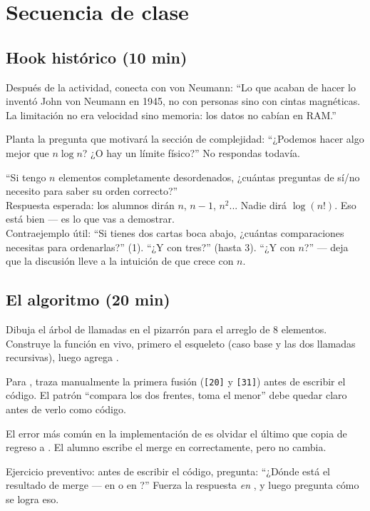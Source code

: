\documentclass[12pt, oneside]{article}
\begin{document}
\section{Secuencia de clase}

\subsection{Hook histórico (10 min)}

Después de la actividad, conecta con von Neumann: ``Lo que acaban de hacer
lo inventó John von Neumann en 1945, no con personas sino con cintas magnéticas.
La limitación no era velocidad sino memoria: los datos no cabían en RAM.''

Planta la pregunta que motivará la sección de complejidad:
``¿Podemos hacer algo mejor que $n \log n$? ¿O hay un límite físico?''
No respondas todavía.

\begin{notaprofesor}
  ``Si tengo $n$ elementos completamente desordenados, ¿cuántas preguntas
  de sí/no necesito para saber su orden correcto?''\\
  Respuesta esperada: los alumnos dirán $n$, $n-1$, $n^2$... Nadie dirá
  $\log(n!)$. Eso está bien — es lo que vas a demostrar.\\
  Contraejemplo útil: ``Si tienes dos cartas boca abajo, ¿cuántas comparaciones
  necesitas para ordenarlas?'' (1). ``¿Y con tres?'' (hasta 3). ``¿Y con $n$?''
  — deja que la discusión lleve a la intuición de que crece con $n$.
\end{notaprofesor}

\subsection{El algoritmo (20 min)}

Dibuja el árbol de llamadas en el pizarrón para el arreglo de 8 elementos.
Construye la función  en vivo, primero el esqueleto (caso base
y las dos llamadas recursivas), luego agrega .

Para , traza manualmente la primera fusión
(\texttt{[20]} y \texttt{[31]}) antes de escribir el código. El patrón
``compara los dos frentes, toma el menor'' debe quedar claro antes de verlo
como código.

\begin{notaprofesor}
  El error más común en la implementación de  es olvidar el
  último  que copia  de regreso a . El alumno
  escribe el merge en  correctamente, pero  no cambia.
  \par\smallskip
  Ejercicio preventivo: antes de escribir el código, pregunta: ``¿Dónde
  está el resultado de merge — en  o en ?'' Fuerza la
  respuesta \textit{en }, y luego pregunta cómo se logra eso.
\end{notaprofesor}
\end{document}
